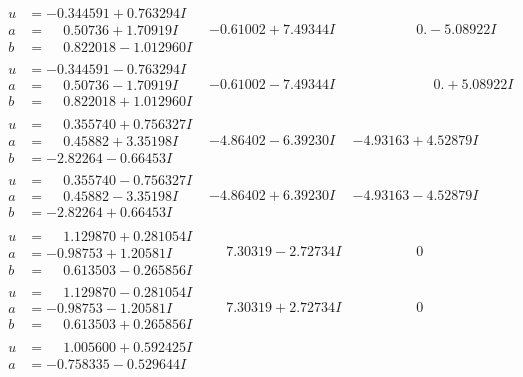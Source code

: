 \documentclass[1p]{elsarticle_modified}
\theoremstyle{definition}
\begin{document}
$$\begin{array}{c|c|c}
 \hline 
\begin{aligned}
u &= -0.344591 + 0.763294 I \\
a &= \phantom{-}0.50736 + 1.70919 I \\
b &= \phantom{-}0.822018 - 1.012960 I\end{aligned}
 & -0.61002 + 7.49344 I & \phantom{-0.000000 } 0. - 5.08922 I \\ \hline\begin{aligned}
u &= -0.344591 - 0.763294 I \\
a &= \phantom{-}0.50736 - 1.70919 I \\
b &= \phantom{-}0.822018 + 1.012960 I\end{aligned}
 & -0.61002 - 7.49344 I & \phantom{-0.000000 -}0. + 5.08922 I \\ \hline\begin{aligned}
u &= \phantom{-}0.355740 + 0.756327 I \\
a &= \phantom{-}0.45882 + 3.35198 I \\
b &= -2.82264 - 0.66453 I\end{aligned}
 & -4.86402 - 6.39230 I & -4.93163 + 4.52879 I \\ \hline\begin{aligned}
u &= \phantom{-}0.355740 - 0.756327 I \\
a &= \phantom{-}0.45882 - 3.35198 I \\
b &= -2.82264 + 0.66453 I\end{aligned}
 & -4.86402 + 6.39230 I & -4.93163 - 4.52879 I \\ \hline\begin{aligned}
u &= \phantom{-}1.129870 + 0.281054 I \\
a &= -0.98753 + 1.20581 I \\
b &= \phantom{-}0.613503 - 0.265856 I\end{aligned}
 & \phantom{-}7.30319 - 2.72734 I & \phantom{-0.000000 } 0 \\ \hline\begin{aligned}
u &= \phantom{-}1.129870 - 0.281054 I \\
a &= -0.98753 - 1.20581 I \\
b &= \phantom{-}0.613503 + 0.265856 I\end{aligned}
 & \phantom{-}7.30319 + 2.72734 I & \phantom{-0.000000 } 0 \\ \hline\begin{aligned}
u &= \phantom{-}1.005600 + 0.592425 I \\
a &= -0.758335 - 0.529644 I \\

\end{aligned}
\end{array}$$
\end{document}

